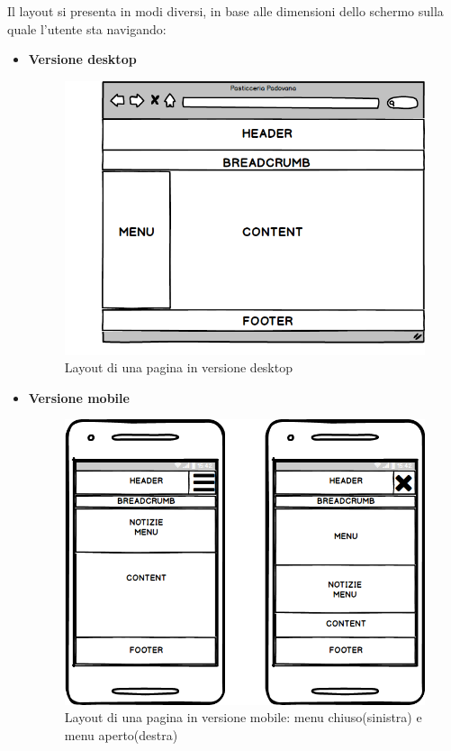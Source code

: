 \newpage
Il layout si presenta in modi diversi, in base alle dimensioni dello schermo sulla quale l'utente sta navigando:\\
\begin{itemize}
	\item
	\textbf{Versione desktop}\\ 
	\begin{figure}[!h]
		\centering
		\includegraphics[width=0.7\linewidth]{sezioni/Progettazione/Immagini/desktop_layout.png}
	    \caption{Layout di una pagina in versione desktop}
		\label{Fig:verDesktop}
	\end{figure}
	\item	  
	\textbf{Versione mobile}	
	\begin{figure}[!h]				  
		\centering
		\includegraphics[width=0.7\linewidth]{sezioni/Progettazione/Immagini/mobile_layout.png}
	    \caption{Layout di una pagina in versione mobile: menu chiuso(sinistra) e menu aperto(destra)}
	    \label{Fig:verMobile}
	\end{figure}	  
\end{itemize}
\newpage
